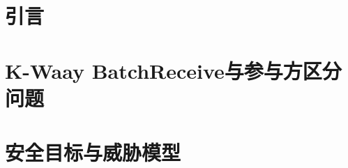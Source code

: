 

\setcounter{section}{-1}

\section{引言}
\label{sec:introduction}


\section{K-Waay BatchReceive与参与方区分问题}
\label{sec:identity-problem}


\section{安全目标与威胁模型}
\label{sec:objective-threat-model}




